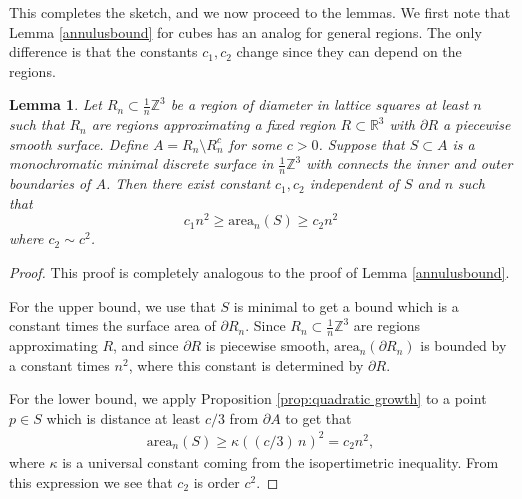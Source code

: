 \documentclass[11pt]{article}
\newtheorem{lemma}[thm]{Lemma}
\theoremstyle{remark}
\theoremstyle{definition}
\newcommand{\m}[1]{\mathbb{#1}}
\begin{document}
This completes the sketch, and we now proceed to the lemmas. We first note that Lemma \ref{annulusbound} for cubes has an analog for general regions. The only difference is that the constants $c_1,c_2$ change since they can depend on the regions. 
\begin{lemma}\label{lem:general_annulusbound}
    Let $R_n\subset \frac{1}{n} \m Z^3$ be a region of diameter in lattice squares at least $n$ such that $R_n$ are regions approximating a fixed region $R\subset \m R^3$ with $\partial R$ a piecewise smooth surface. Define $A = R_n\setminus R_n^c$ for some $c>0$. Suppose that $S\subset A$ is a monochromatic minimal discrete surface in $\frac{1}{n}\m Z^3$ with connects the inner and outer boundaries of $A$. Then there exist constant $c_1,c_2$ independent of $S$ and $n$ such that $$ c_1 n^2 \geq \text{area}_n(S) \geq c_2 n^2$$
    where $c_2 \sim c^2$.
\end{lemma}
\begin{proof}
This proof is completely analogous to the proof of Lemma \ref{annulusbound}.     

For the upper bound, we use that $S$ is minimal to get a bound which is a constant times the surface area of $\partial R_n$. Since $R_n\subset \frac{1}{n}\m Z^3$ are regions approximating $R$, and since $\partial R$ is piecewise smooth, $\text{area}_n(\partial R_n)$ is bounded by a constant times $n^2$, where this constant is determined by $\partial R$. 
        
For the lower bound, we apply Proposition \ref{prop:quadratic growth} to a point $p\in S$ which is distance at least $c/3$ from $\partial A$ to get that 
    \begin{align*}
        \text{area}_n(S) \geq \kappa ((c/3)\, n)^2 = c_2 n^2,
    \end{align*}
    where $\kappa$ is a universal constant coming from the isopertimetric inequality. From this expression we see that $c_2$ is order $c^2$.
\end{proof}
\end{document}
